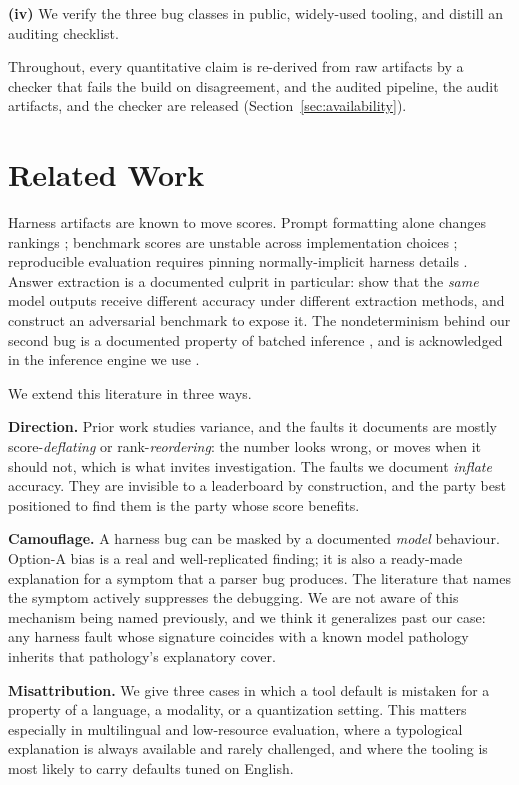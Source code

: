 \documentclass{article}
\begin{document}
\textbf{(iv)} We verify the three bug classes in public, widely-used tooling, and distill an auditing checklist.

Throughout, every quantitative claim is re-derived from raw artifacts by a checker that fails the build on disagreement, and the audited pipeline, the audit artifacts, and the checker are released (Section~\ref{sec:availability}).

\section{Related Work}

Harness artifacts are known to move scores. Prompt formatting alone changes rankings \cite{sclar2024formatspread}; benchmark scores are unstable across implementation choices \cite{alzahrani2024benchmarks}; reproducible evaluation requires pinning normally-implicit harness details \cite{biderman2024lessons}. Answer extraction is a documented culprit in particular:  show that the \emph{same} model outputs receive different accuracy under different extraction methods, and construct an adversarial benchmark to expose it. The nondeterminism behind our second bug is a documented property of batched inference \cite{he2025nondeterminism}, and is acknowledged in the inference engine we use \cite{llamacpp}.

We extend this literature in three ways.

\textbf{Direction.} Prior work studies variance, and the faults it documents are mostly score-\emph{deflating} or rank-\emph{reordering}: the number looks wrong, or moves when it should not, which is what invites investigation. The faults we document \emph{inflate} accuracy. They are invisible to a leaderboard by construction, and the party best positioned to find them is the party whose score benefits.

\textbf{Camouflage.} A harness bug can be masked by a documented \emph{model} behaviour. Option-A bias \cite{zheng2024selectors} is a real and well-replicated finding; it is also a ready-made explanation for a symptom that a parser bug produces. The literature that names the symptom actively suppresses the debugging. We are not aware of this mechanism being named previously, and we think it generalizes past our case: any harness fault whose signature coincides with a known model pathology inherits that pathology's explanatory cover.

\textbf{Misattribution.} We give three cases in which a tool default is mistaken for a property of a language, a modality, or a quantization setting. This matters especially in multilingual and low-resource evaluation, where a typological explanation is always available and rarely challenged, and where the tooling is most likely to carry defaults tuned on English.
\end{document}
